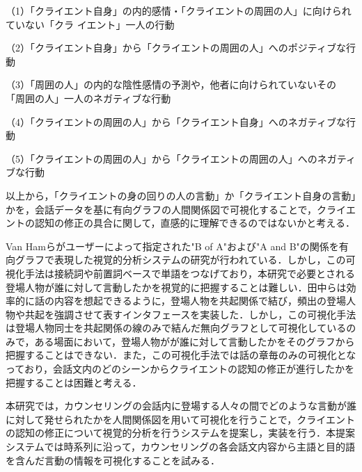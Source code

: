 \documentclass[shuuron]{kuee}
\begin{document}
（1）「クライエント自身」の内的感情・「クライエントの周囲の人」に向けられていない「クラ
  イエント」一人の行動

（2）「クライエント自身」から「クライエントの周囲の人」へのポジティブな行動

（3）「周囲の人」の内的な陰性感情の予測や，他者に向けられていないその
  「周囲の人」一人のネガティブな行動

（4）「クライエントの周囲の人」から「クライエント自身」へのネガティブな行動

（5）「クライエントの周囲の人」から「クライエントの周囲の人」へのネガティブな行動


以上から，「クライエントの身の回りの人の言動」か「クライエント自身の言動」かを，会話データを基に有向グラフの人間関係図で可視化することで，クライエントの認知の修正の具合に関して，直感的に理解できるのではないかと考える．

Van Hamら\cite{van2009mapping}がユーザーによって指定された"B of A"および"A and B"の関係を有向グラフで表現した視覚的分析システムの研究が行われている．しかし，この可視化手法は接続詞や前置詞ベースで単語をつなげており，本研究で必要とされる登場人物が誰に対して言動したかを視覚的に把握することは難しい．田中ら\cite{tanaka}は効率的に話の内容を想起できるように，登場人物を共起関係で結び，頻出の登場人物や共起を強調させて表すインタフェースを実装した．しかし，この可視化手法は登場人物同士を共起関係の線のみで結んだ無向グラフとして可視化しているのみで，ある場面において，登場人物がが誰に対して言動したかをそのグラフから把握することはできない．また，この可視化手法では話の章毎のみの可視化となっており，会話文内のどのシーンからクライエントの認知の修正が進行したかを把握することは困難と考える．

本研究では，カウンセリングの会話内に登場する人々の間でどのような言動が誰に対して発せられたかを人間関係図を用いて可視化を行うことで，クライエントの認知の修正について視覚的分析を行うシステムを提案し，実装を行う．本提案システムでは時系列に沿って，カウンセリングの各会話文内容から主語と目的語を含んだ言動の情報を可視化することを試みる．


\end{document}
